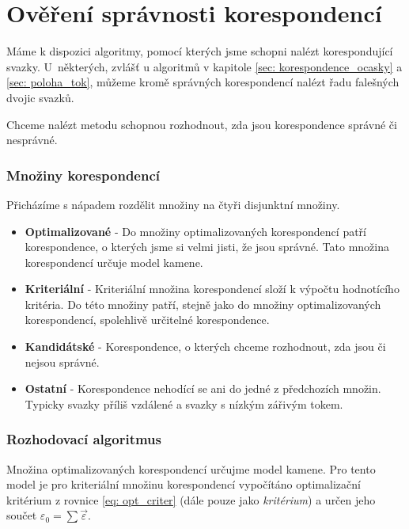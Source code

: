 \part{Ověření správnosti korespondencí}	
	
	Máme k dispozici algoritmy, pomocí kterých jsme schopni nalézt korespondující svazky. U~některých, zvlášť u algoritmů v kapitole  \ref{sec: korespondence_ocasky} a \ref{sec: poloha_tok}, můžeme kromě správných korespondencí nalézt řadu falešných  dvojic svazků.
	
	Chceme nalézt metodu schopnou rozhodnout, zda jsou korespondence správné či nesprávné. 
	\vspace{4mm}
	
\section{Množiny korespondencí}
Přicházíme s nápadem rozdělit množiny na čtyři disjunktní množiny.

	\begin{itemize}
	\item \textbf{Optimalizované} -  Do množiny optimalizovaných korespondencí patří korespondence, o kterých jsme si velmi jisti, že jsou správné. Tato množina korespondencí určuje model kamene. 
	
	\item \textbf{Kriteriální} - Kriteriální množina korespondencí složí k výpočtu hodnotícího kritéria. Do této množiny patří, stejně jako do množiny optimalizovaných korespondencí, spolehlivě určitelné korespondence.  
	
	\item \textbf{Kandidátské} - Korespondence, o kterých chceme rozhodnout, zda jsou či nejsou správné.  
	
	\item \textbf{Ostatní} - Korespondence nehodící se ani do jedné z předchozích množin. Typicky svazky příliš vzdálené a svazky s nízkým zářivým tokem.  
\end{itemize}		
	
\section{Rozhodovací algoritmus}
	Množina optimalizovaných korespondencí určujme model kamene. Pro tento model je pro kriteriální množinu korespondencí vypočítáno optimalizační kritérium z rovnice \ref{eq: opt_criter} (dále pouze jako \textit{kritérium}) a určen jeho součet $\varepsilon_0 = \sum\vec{\varepsilon}$.
	 
